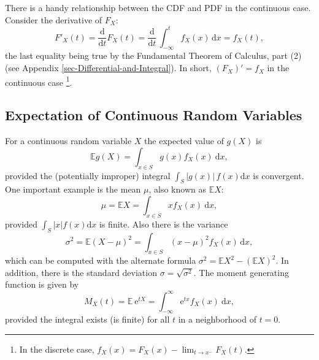\documentclass[captions=tableheading]{scrbook}
\begin{document}
There is a handy relationship between the CDF and PDF in the continuous case. Consider the derivative of \(F_{X}\):
\begin{equation}
F'_{X}(t)=\frac{\mathrm{d}}{\mathrm{d} t}F_{X}(t)=\frac{\mathrm{d}}{\mathrm{d} t}\,\int_{-\infty}^{t}f_{X}(x)\,\mathrm{d} x=f_{X}(t),
\end{equation}
the last equality being true by the Fundamental Theorem of Calculus, part (2) (see Appendix \ref{sec-Differential-and-Integral}). In short, \((F_{X})'=f_{X}\) in the continuous case
\footnote{In the discrete case, \(f_{X}(x)=F_{X}(x)-\lim_{t\to x^{-}}F_{X}(t)\).}. 
\subsection{Expectation of Continuous Random Variables}
\label{sec-1-1-2}
\label{sub-Expectation-of-Continuous}


For a continuous random variable \(X\) the expected value of \(g(X)\) is
\begin{equation}
\mathbb{E} g(X)=\int_{x\in S}g(x)f_{X}(x)\:\mathrm{d} x,
\end{equation}
provided the (potentially improper) integral \(\int_{S}|g(x)|\, f(x)\mathrm{d} x\) is convergent. One important example is the mean \(\mu\), also known as \(\mathbb{E} X\):
\begin{equation}
\mu=\mathbb{E} X=\int_{x\in S}xf_{X}(x)\:\mathrm{d} x,
\end{equation}
provided \(\int_{S}|x|f(x)\mathrm{d} x\) is finite. Also there is the variance
\begin{equation}
\sigma^{2}=\mathbb{E}(X-\mu)^{2}=\int_{x\in S}(x-\mu)^{2}f_{X}(x)\,\mathrm{d} x,
\end{equation}
which can be computed with the alternate formula \(\sigma^{2}=\mathbb{E} X^{2}-(\mathbb{E} X)^{2}\). In addition, there is the standard deviation \(\sigma=\sqrt{\sigma^{2}}\). The moment generating function is given by
\begin{equation}
M_{X}(t)=\mathbb{E}\:\mathrm{e}^{tX}=\int_{-\infty}^{\infty}\mathrm{e}^{tx}f_{X}(x)\:\mathrm{d} x,
\end{equation}
provided the integral exists (is finite) for all \(t\) in a neighborhood of \(t=0\).
\end{document}
